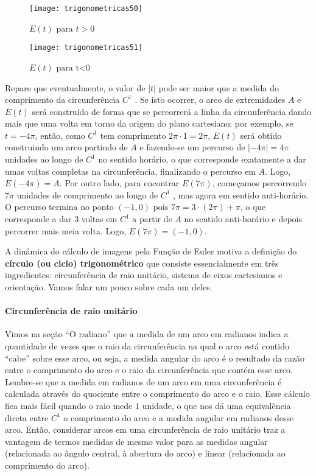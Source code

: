 \begin{minipage}{.45\linewidth}
\begin{figure}[H]
\centering

\texttt{[image: trigonometricas50]}
\caption{$E(t)$ para $t>0$}
\label{}
\end{figure}
\end{minipage}
\begin{minipage}{.45\linewidth}
\begin{figure}[H]
\centering

\texttt{[image: trigonometricas51]}
\caption{$E(t) \text{ para } $t<0}
\label{}
\end{figure}
\end{minipage}

Repare que eventualmente, o valor de $|t|$ pode ser maior que a medida do comprimento da circunferência $C^1$ . Se isto ocorrer, o arco de extremidades $A$ e $E(t)$ será construído de forma que se percorrerá a linha da circunferência dando mais que uma volta em torno da origem do plano cartesiano: por exemplo, se $t=-4\pi$, então, como $C^1$ tem comprimento $2\pi\cdot1=2\pi$, $E(t)$ será obtido construindo um arco partindo de $A$ e fazendo-se um percurso de $|-4\pi |=4\pi$ unidades ao longo de $C^1$ no sentido horário, o que corresponde exatamente a dar umas voltas completas na circunferência, finalizando o percurso em $A$. Logo, $E(-4\pi)=A$. Por outro lado, para encontrar $E(7\pi)$, começamos percorrendo $7\pi$ unidades de comprimento ao longo de $C^1$ , mas agora em sentido anti-horário. O percurso termina no ponto $(-1,0)$ pois $7\pi=3\cdot(2\pi)+\pi$, o que corresponde a dar $3$ voltas em $C^1$ a partir de $A$ no sentido anti-horário e depois percorrer mais meia volta. Logo, $E(7\pi) = (-1,0)$.

A dinâmica do cálculo de imagens pela Função de Euler motiva a definição do \textbf{círculo (ou ciclo) trigonométrico} que consiste essencialmente em três ingredientes: circunferência de raio unitário, sistema de eixos cartesianos e orientação. Vamos falar um pouco sobre cada um deles.

\paragraph{Circunferência de raio unitário}

Vimos na seção “O radiano”{} que a medida de um arco em radianos indica a quantidade de vezes que o raio da circunferência na qual o arco está contido “cabe”{} sobre esse arco, ou seja, a medida angular do arco é o resultado da razão entre o comprimento do arco e o raio da circunferência que contém esse arco. Lembre-se que a medida em radianos de um arco em uma circunferência é calculada através do quociente entre o comprimento do arco e o raio. Esse cálculo fica mais fácil quando o raio mede $1$ unidade, o que nos dá uma equivalência direta entre $C^1$ o comprimento do arco e a medida angular em radianos desse arco. Então, considerar arcos em uma circunferência de raio unitário traz a vantagem de termos medidas de mesmo valor para as medidas angular (relacionada ao ângulo central, à abertura do arco) e linear (relacionada ao comprimento do arco).

